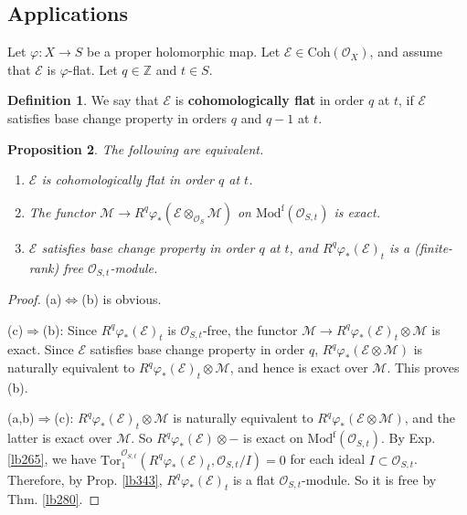 \documentclass[12pt,b5paper,notitlepage]{report}
\theoremstyle{definition}
\newtheorem{df}{Definition}[section]
\theoremstyle{plain}
\newtheorem{pp}[df]{Proposition}
\newcommand{\mc}{\mathcal}
\newcommand{\scr}{\mathscr}
\newcommand{\Zbb}{\mathbb Z}
\newcommand{\Tor}{\mathrm{Tor}}
\newcommand{\Coh}{\mathrm{Coh}}
\newcommand{\Modf}{\mathrm{Mod}^{\mathrm f}}
\numberwithin{equation}{section}
\begin{document}
\subsection{Applications}

Let $\varphi:X\rightarrow S$ be a proper holomorphic map. Let $\scr E\in\Coh(\scr O_X)$, and assume that $\scr E$ is $\varphi$-flat. Let $q\in\Zbb$ and $t\in S$. 


\begin{df}
We say that $\scr E$ is \textbf{cohomologically flat}  in order $q$ at $t$, if $\scr E$ satisfies base change property in orders $q$ and $q-1$ at $t$.
\end{df}


\begin{pp}\label{lb344}
The following are equivalent.
\begin{enumerate}[label=(\alph*)]
\item $\scr E$ is cohomologically flat in order $q$ at $t$.
\item The functor $\mc M\rightarrow R^q\varphi_*(\scr E\otimes_{\scr O_S}\mc M)$ on $\Modf(\scr O_{S,t})$ is exact.
\item $\scr E$ satisfies base change property in order $q$ at $t$, and $R^q\varphi_*(\scr E)_t$ is a (finite-rank) free $\scr O_{S,t}$-module.
\end{enumerate}
\end{pp}

\begin{proof}
(a)$\Leftrightarrow$(b) is obvious.

(c)$\Rightarrow$(b): Since $R^q\varphi_*(\scr E)_t$ is $\scr O_{S,t}$-free, the functor $\mc M\rightarrow R^q\varphi_*(\scr E)_t\otimes\mc M$ is exact. Since $\scr E$ satisfies base change property in order $q$, $R^q\varphi_*(\scr E\otimes\mc M)$ is naturally equivalent to $R^q\varphi_*(\scr E)_t\otimes \mc M$, and hence is exact over $\mc M$. This proves (b).

(a,b)$\Rightarrow$(c): $R^q\varphi_*(\scr E)_t\otimes \mc M$ is naturally equivalent to $R^q\varphi_*(\scr E\otimes\mc M)$, and the latter is exact over $\mc M$. So $R^q\varphi_*(\scr E)\otimes-$ is exact on $\Modf(\scr O_{S,t})$. By Exp. \ref{lb265}, we have $\Tor_1^{\scr O_{S,t}}(R^q\varphi_*(\scr E)_t,\scr O_{S,t}/I)=0$ for each ideal $I\subset\scr O_{S,t}$. Therefore, by Prop. \ref{lb343}, $R^q\varphi_*(\scr E)_t$ is a flat $\scr O_{S,t}$-module. So it is free by Thm. \ref{lb280}.
\end{proof}
\end{document}
